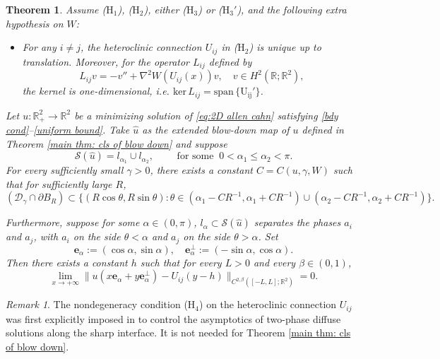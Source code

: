 \documentclass[leqno,11pt]{amsart}
\let\pa=\partial
\let\al=\alpha
\let\g=\gamma
\let\pa=\partial
\let\ri=\rightarrow
\newtheorem{theorem}{Theorem}[section]
\theoremstyle{remark}
\newtheorem{rmk}{Remark}[section]
\newcommand{\BR}{\mathbb{R}}
\begin{document}
\begin{theorem}\label{main thm: refined behavior near interface}
Assume ($\mathrm{H}_1$), ($\mathrm{H}_2$), either ($\mathrm{H}_3$) or ($\mathrm{H}_3'$), and the following extra hypothesis on $W$:
\begin{itemize}
    \item[($\mathrm{H}_4$)] For any $i\neq j$, the heteroclinic connection $U_{ij}$ in ($\mathrm{H}_2$) is unique up to translation. Moreover, for the operator $L_{ij}$ defined by
    \begin{equation*}
        L_{ij}v=-v''+\nabla^2 W(U_{ij}(x))v, \quad v\in H^2(\BR;\BR^2),
    \end{equation*}
    the kernel is one-dimensional, i.e. $\mathrm{ker}\,L_{ij}=\mathrm{span\,\{U_{ij}'\}}$.
\end{itemize}
Let $u:\BR_+^2\to \BR^2$ be a minimizing solution of \eqref{eq:2D allen cahn} satisfying \eqref{bdy cond}--\eqref{uniform bound}. Take $\hat{u}$ as the extended blow-down map of $u$ defined in Theorem \ref{main thm: cls of blow down} and suppose 
$$\mathcal{S}(\hat{u})=l_{\al_1}\cup l_{\al_2},\qquad\text{ 
for some }\  0< \al_1\leq \al_2< \pi.$$
For every sufficiently small $\g>0$, there exists a constant $C=C(u,\g,W)$ such that for sufficiently large $R$,
\begin{equation}\label{main thm 2:localization of diff interface}
    \left(\mathcal{D}_\g\cap \pa B_R \right) \subset\{(R\cos\theta,R\sin\theta): \theta\in(\al_1-CR^{-1}, \al_1+CR^{-1})\cup (\al_2-CR^{-1}, \al_2+CR^{-1})\}.
\end{equation}

Furthermore, suppose for some $\alpha\in (0,\pi)$, $l_\alpha\subset \mathcal{S}(\hat{u})$ separates the phases $a_i$ and $a_j$, with $a_i$ on the side $\theta<\al$ and $a_j$ on the side $\theta>\al$. Set 
$$\mathbf{e}_\al:= (\cos\al,\sin\al),\quad \mathbf{e}_\al^\perp:= (-\sin\al,\cos\al).$$ 
Then there exists a constant $h$ such that for every $L>0$ and every $\beta\in (0,1)$,
\begin{equation}\label{main thm 2:convergence to Uij}
    \lim\limits_{x\ri+\infty} \|u(x\mathbf{e}_\al+y \mathbf{e}_\al^\perp)-U_{ij}(y-h)\|_{C^{2,\beta}([-L,L];\BR^2)}=0.
\end{equation}
\end{theorem}


\begin{rmk}
    The nondegeneracy condition ($\mathrm{H}_4$) on the heteroclinic connection $U_{ij}$ was first explicitly imposed in \cite{schatzman2002asymmetric} to control the asymptotics of two-phase diffuse solutions along the sharp interface. It is not needed for Theorem \ref{main thm: cls of blow down}.
\end{rmk}
\end{document}
